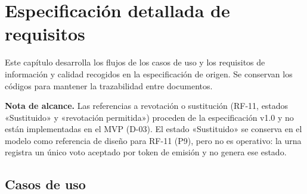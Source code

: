 \chapter{Especificación detallada de requisitos}
\label{cap:especificacion-detallada}

Este capítulo desarrolla los flujos de los casos de uso y los requisitos
de información y calidad recogidos en la especificación de origen. Se
conservan los códigos para mantener la trazabilidad entre documentos.

\textbf{Nota de alcance.} Las referencias a revotación o sustitución (RF-11,
estados «Sustituido» y «revotación permitida») proceden de la especificación
v1.0 y no están implementadas en el MVP (D-03). El estado «Sustituido» se
conserva en el modelo como referencia de diseño para RF-11 (P9), pero no es
operativo: la urna registra un único voto aceptado por token de emisión y no
genera ese estado.

\section{Casos de uso}
\label{sec:casos-uso-detallados}


